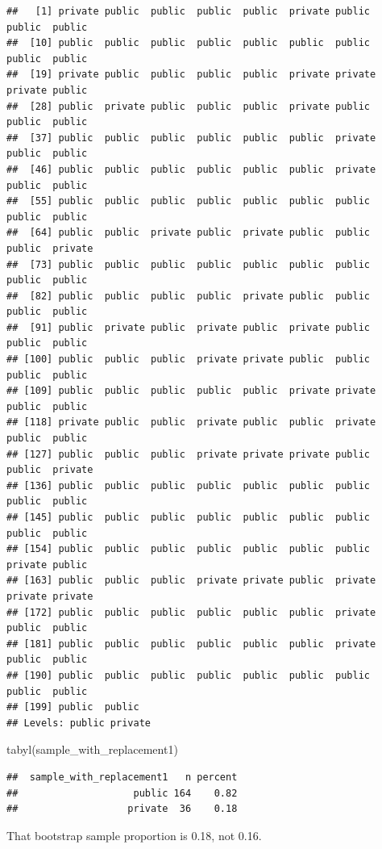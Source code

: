 \documentclass[
]{book}
\newenvironment{Shaded}{\begin{snugshade}}{\end{snugshade}}
\newcommand{\FunctionTok}[1]{\textcolor[rgb]{0.00,0.00,0.00}{#1}}
\newcommand{\NormalTok}[1]{#1}
\begin{document}
\begin{verbatim}
##   [1] private public  public  public  public  private public  public  public 
##  [10] public  public  public  public  public  public  public  public  public 
##  [19] private public  public  public  public  private private private public 
##  [28] public  private public  public  public  private public  public  public 
##  [37] public  public  public  public  public  public  private public  public 
##  [46] public  public  public  public  public  public  private public  public 
##  [55] public  public  public  public  public  public  public  public  public 
##  [64] public  public  private public  private public  public  public  private
##  [73] public  public  public  public  public  public  public  public  public 
##  [82] public  public  public  public  private public  public  public  public 
##  [91] public  private public  private public  private public  public  public 
## [100] public  public  public  private private public  public  public  public 
## [109] public  public  public  public  public  private private public  public 
## [118] private public  public  private public  public  private public  public 
## [127] public  public  public  private private private public  public  private
## [136] public  public  public  public  public  public  public  public  public 
## [145] public  public  public  public  public  public  public  public  public 
## [154] public  public  public  public  public  public  public  private public 
## [163] public  public  public  private private public  private private private
## [172] public  public  public  public  public  public  private public  public 
## [181] public  public  public  public  public  public  private public  public 
## [190] public  public  public  public  public  public  public  public  public 
## [199] public  public 
## Levels: public private
\end{verbatim}

\begin{Shaded}
\begin{Highlighting}[]
\FunctionTok{tabyl}\NormalTok{(sample\_with\_replacement1)}
\end{Highlighting}
\end{Shaded}

\begin{verbatim}
##  sample_with_replacement1   n percent
##                    public 164    0.82
##                   private  36    0.18
\end{verbatim}

That bootstrap sample proportion is 0.18, not 0.16.
\end{document}
